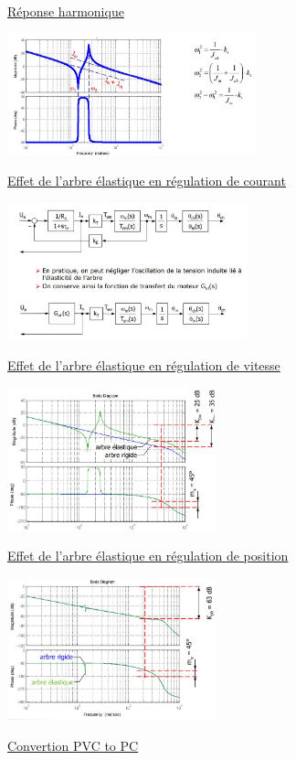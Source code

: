 \documentclass[	DIV=calc,%
							paper=a4,%
							fontsize=10pt,%
							twocolumn]{scrartcl} %
\newcommand{\formtitle}[1]{\large\underline{#1}}
\begin{document}
\formtitle{Réponse harmonique}

\includegraphics[width=0.54\textwidth]{img/arbre_elastique_rep.JPG}


\formtitle{Effet de l’arbre élastique en régulation de courant}

\includegraphics[width=0.52\textwidth]{img/arbre_elastique_bloc.JPG}


\formtitle{Effet de l’arbre élastique en régulation de vitesse}

\includegraphics[width=0.45\textwidth]{img/arbre_elastique_vit.JPG}


\formtitle{Effet de l’arbre élastique en régulation de position}

\includegraphics[width=0.45\textwidth]{img/arbre_elastique_pos.JPG}

\formtitle{Convertion PVC to PC }\\
\end{document}
